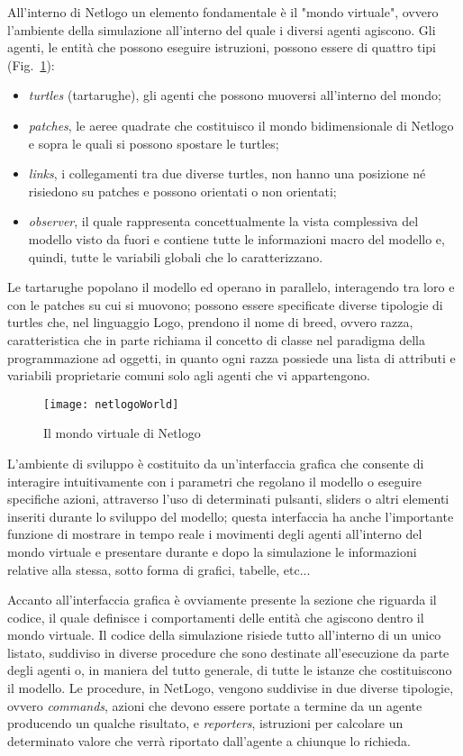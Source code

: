 All'interno di Netlogo un elemento fondamentale è il "mondo virtuale", ovvero l'ambiente della simulazione all'interno del quale i diversi agenti agiscono. Gli agenti, le entità che possono eseguire istruzioni, possono essere di quattro tipi (Fig.~\ref{netlogoWorld}): \begin{itemize}
\item \emph{turtles} (tartarughe), gli agenti che possono muoversi all'interno del mondo;
\item \emph{patches}, le aeree quadrate che costituisco il mondo bidimensionale di Netlogo e sopra le quali si possono spostare le turtles;
\item \emph{links}, i collegamenti tra due diverse turtles, non hanno una posizione né risiedono su patches e possono orientati o non orientati;
\item \emph{observer}, il quale rappresenta concettualmente la vista complessiva del modello visto da fuori e contiene tutte le informazioni macro del modello e, quindi, tutte le variabili globali che lo caratterizzano.
\end{itemize}
Le tartarughe popolano il modello ed operano in parallelo, interagendo tra loro e con le patches su cui si muovono; possono essere specificate diverse tipologie di turtles che, nel linguaggio Logo, prendono il nome di breed, ovvero razza, caratteristica che in parte richiama il concetto di classe nel paradigma della programmazione ad oggetti, in quanto ogni razza possiede una lista di attributi e variabili proprietarie comuni solo agli agenti che vi appartengono.

\begin{figure}[H]
	\begin{center}
	\texttt{[image: netlogoWorld]}
	\end{center}
	\caption{Il mondo virtuale di Netlogo}
  	\label{netlogoWorld}
\end{figure}

L'ambiente di sviluppo è costituito da un'interfaccia grafica che consente di interagire intuitivamente con i parametri che regolano il modello o eseguire specifiche azioni, attraverso l'uso di determinati pulsanti, sliders o altri elementi inseriti durante lo sviluppo del modello; questa interfaccia ha anche l'importante funzione di mostrare in tempo reale i movimenti degli agenti all'interno del mondo virtuale e presentare durante e dopo la simulazione le informazioni relative alla stessa, sotto forma di grafici, tabelle, etc...

Accanto all'interfaccia grafica è ovviamente presente la sezione che riguarda il codice, il quale definisce i comportamenti delle entità  che agiscono dentro il mondo virtuale. Il codice della simulazione risiede tutto all'interno di un unico listato, suddiviso in diverse procedure che sono destinate all'esecuzione da parte degli agenti o, in maniera del tutto generale, di tutte le istanze che costituiscono il modello. Le procedure, in NetLogo, vengono suddivise in due diverse tipologie, ovvero \emph{commands}, azioni che devono essere portate a termine da un agente producendo un qualche risultato, e \emph{reporters}, istruzioni per calcolare un determinato valore che verrà riportato dall'agente a chiunque lo richieda. 


